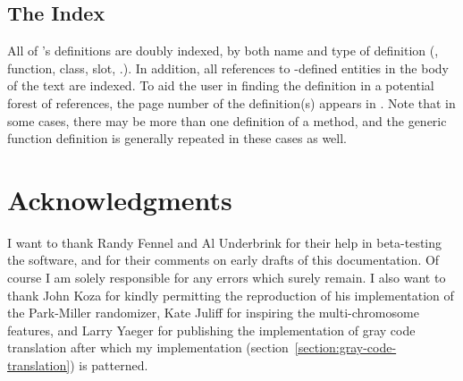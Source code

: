 
\subsection {The Index}

All of \geco's definitions are doubly indexed, by both name and type of
definition (\eg, function, class, slot, \etc.). In addition, all references to
\geco-defined entities in the body of the text are indexed.  To aid the
user in finding the definition in a potential forest of references, the
page number of the definition(s) appears in . 
Note that in some cases, there may be more than one definition of a
method, and the generic function definition is generally repeated in
these cases as well.


\section {Acknowledgments}

I want to thank Randy Fennel and Al Underbrink for their help in beta-testing
the software, and for their comments on early drafts of this documentation. Of
course I am solely responsible for any errors which surely remain. I also want
to thank John Koza for kindly permitting the reproduction of his implementation
of the Park-Miller randomizer, Kate Juliff for inspiring the multi-chromosome
features, and Larry Yaeger for publishing the  implementation of gray code
translation after which my implementation
(section~\ref{section:gray-code-translation}) is patterned. 
